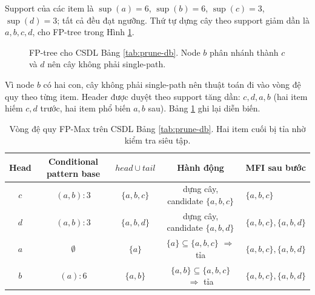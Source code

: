 Support của các item là $\operatorname{sup}(a)=6$, $\operatorname{sup}(b)=6$, $\operatorname{sup}(c)=3$, $\operatorname{sup}(d)=3$; tất cả đều đạt ngưỡng. Thứ tự dựng cây theo support giảm dần là $a,b,c,d$, cho FP-tree trong Hình \ref{fig:fptree-prune}.

\begin{figure}[H]
    \centering
    \caption{FP-tree cho CSDL Bảng \ref{tab:prune-db}. Node $b$ phân nhánh thành $c$ và $d$ nên cây không phải single-path.}
    \label{fig:fptree-prune}
\end{figure}

Vì node $b$ có hai con, cây không phải single-path nên thuật toán đi vào vòng đệ quy theo từng item. Header được duyệt theo support tăng dần: $c,d,a,b$ (hai item hiếm $c,d$ trước, hai item phổ biến $a,b$ sau). Bảng \ref{tab:prune-trace} ghi lại diễn biến.

\begin{table}[H]
    \centering
    \caption{Vòng đệ quy FP-Max trên CSDL Bảng \ref{tab:prune-db}. Hai item cuối bị tỉa nhờ kiểm tra siêu tập.}
    \label{tab:prune-trace}
    \small
    \begin{tabular}{c c c c l}
        \toprule
        Head & Conditional pattern base & $head\cup tail$ & Hành động & MFI sau bước \\
        \midrule
        $c$ & $(a,b):3$ & $\{a,b,c\}$ & dựng cây, candidate $\{a,b,c\}$ & $\{a,b,c\}$ \\
        $d$ & $(a,b):3$ & $\{a,b,d\}$ & dựng cây, candidate $\{a,b,d\}$ & $\{a,b,c\},\{a,b,d\}$ \\
        $a$ & $\emptyset$ & $\{a\}$ & $\{a\}\subseteq\{a,b,c\}$ $\Rightarrow$ tỉa & $\{a,b,c\},\{a,b,d\}$ \\
        $b$ & $(a):6$ & $\{a,b\}$ & $\{a,b\}\subseteq\{a,b,c\}$ $\Rightarrow$ tỉa & $\{a,b,c\},\{a,b,d\}$ \\
        \bottomrule
    \end{tabular}
\end{table}

